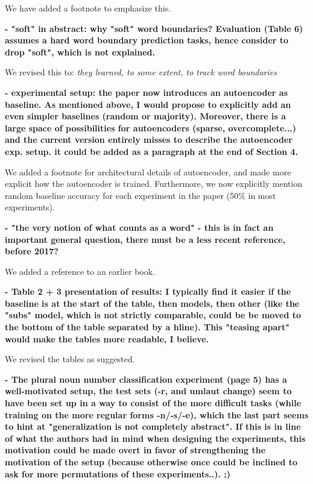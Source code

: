 \documentclass{article}[11pt,a4paper,oneside]
\begin{document}
We have added a footnote to emphasize this.\newline

\textbf{- "soft" in abstract: why "soft" word boundaries? Evaluation (Table 6)
assumes a hard word boundary prediction tasks, hence consider to drop
"soft", which is not explained.}

We revised this to: \textit{they learned, to some extent, to track word boundaries}\newline

\textbf{- experimental setup: the paper now introduces an autoencoder as baseline.
As mentioned above, I would propose to explicitly add an even simpler
baselines (random or majority). Moreover, there is a large space of
possibilities for autoencoders (sparse, overcomplete...) and the current
version entirely misses to describe the autoencoder exp. setup. it could be
added as a paragraph at the end of Section 4.}

We added a footnote for architectural details of autoencoder, and made more explicit how the autoencoder is trained. Furthermore, we now explicitly mention random baseline accuracy for each experiment in the paper (50\% in most experiments).\newline

\textbf{- "the very notion of what counts as a word" - this is in fact an important
general question, there must be a less recent reference, before 2017?}

We added a reference to an earlier book.\newline

\textbf{- Table 2 + 3 presentation of results: I typically find it easier if the
baseline is at the start of the table, then models, then other (like the
"subs" model, which is not strictly comparable, could be be moved to the
bottom of the table separated by a hline). This "teasing apart" would make
the tables more readable, I believe.}

We revised the tables as suggested.\newline

\textbf{- The plural noun number classification experiment (page 5) has a
well-motivated setup, the test sets (-r, and umlaut change) seem to have
been set up in a way to consist of the more difficult tasks (while training
on the more regular forms -n/-s/-e), which the last part seems to hint at
"generalization is not completely abstract". If this is in line of what the
authors had in mind when designing the experiments, this motivation could be
made overt in favor of strengthening the motivation of the setup (because
otherwise once could be inclined to ask for more permutations of these
experiments..). ;)}
\end{document}
